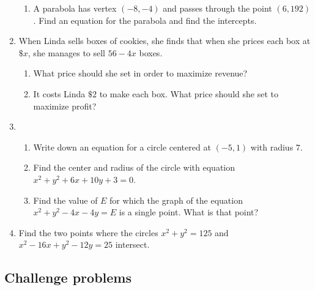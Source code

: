 \begin{enumerate}
\begin{enumerate}
\item A parabola has vertex $(-8,-4)$ and passes through the point $(6, 192)$. Find an equation for the parabola and find the intercepts.
\end{enumerate}
\item When Linda sells boxes of cookies, she finds that when she prices each box at $\$x$, she manages to sell $56 - 4x$ boxes.
\begin{enumerate}
\item What price should she set in order to maximize revenue?
\item It costs Linda $\$2$ to make each box. What price should she set to maximize profit?
\end{enumerate}
\item \begin{enumerate}
\item Write down an equation for a circle centered at $(-5, 1)$ with radius $7$.
\item Find the center and radius of the circle with equation $x^2 + y^2 + 6x + 10y + 3 = 0$.
\item Find the value of $E$ for which the graph of the equation $x^2 + y^2 - 4x - 4y = E$ is a single point. What is that point?
\end{enumerate}
\item Find the two points where the circles $x^2 + y^2 = 125$ and $x^2 - 16x + y^2 - 12y = 25$ intersect.
\end{enumerate}


\subsection{Challenge problems}

